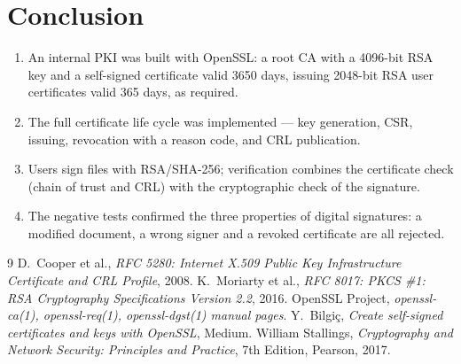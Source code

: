 \documentclass[12pt,a4paper]{article}
\begin{document}
\section{Conclusion}
\begin{enumerate}
  \item An internal PKI was built with OpenSSL: a root CA with a 4096-bit RSA key and a
        self-signed certificate valid 3650 days, issuing 2048-bit RSA user certificates valid 365
        days, as required.
  \item The full certificate life cycle was implemented — key generation, CSR, issuing,
        revocation with a reason code, and CRL publication.
  \item Users sign files with RSA/SHA-256; verification combines the certificate check (chain of
        trust and CRL) with the cryptographic check of the signature.
  \item The negative tests confirmed the three properties of digital signatures: a modified
        document, a wrong signer and a revoked certificate are all rejected.
\end{enumerate}

\begin{thebibliography}{9}
 D.\ Cooper et al., \emph{RFC 5280: Internet X.509 Public Key Infrastructure
  Certificate and CRL Profile}, 2008.
 K.\ Moriarty et al., \emph{RFC 8017: PKCS \#1: RSA Cryptography Specifications
  Version 2.2}, 2016.
 OpenSSL Project, \emph{openssl-ca(1), openssl-req(1), openssl-dgst(1) manual pages}.
 Y.\ Bilgiç, \emph{Create self-signed certificates and keys with OpenSSL}, Medium.
 William Stallings, \emph{Cryptography and Network Security: Principles and
  Practice}, 7th Edition, Pearson, 2017.
\end{thebibliography}
\end{document}
